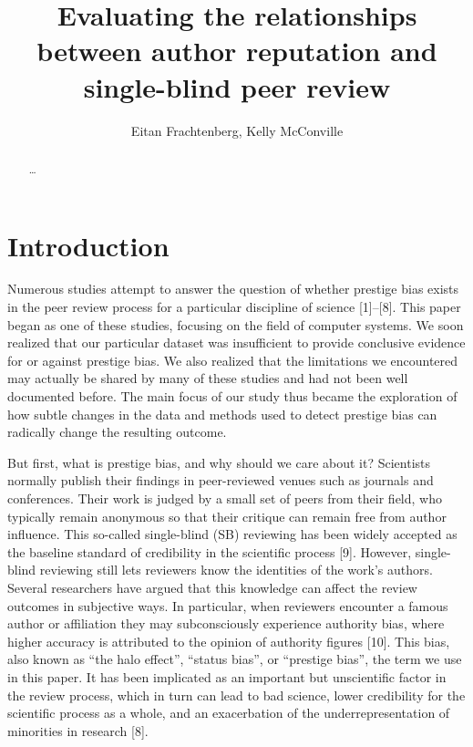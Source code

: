 \documentclass[12pt]{article}
\title{Evaluating the relationships between author reputation and single-blind peer review}
\author{Eitan Frachtenberg, Kelly McConville}
\begin{document}
\maketitle

\begin{abstract}
  \ldots{}
\end{abstract}

\hypertarget{sec:intro}{%
\section{Introduction}\label{sec:intro}}

Numerous studies attempt to answer the question of whether prestige bias exists in the peer review process for a particular discipline of science {[}1{]}--{[}8{]}.
This paper began as one of these studies, focusing on the field of computer systems.
We soon realized that our particular dataset was insufficient to provide conclusive evidence for or against prestige bias.
We also realized that the limitations we encountered may actually be shared by many of these studies and had not been well documented before.
The main focus of our study thus became the exploration of how subtle changes in the data and methods used to detect prestige bias can radically change the resulting outcome.

But first, what is prestige bias, and why should we care about it?
Scientists normally publish their findings in peer-reviewed venues such as journals and conferences.
Their work is judged by a small set of peers from their field, who typically remain anonymous so that their critique can remain free from author influence.
This so-called single-blind (SB) reviewing has been widely accepted as the baseline standard of credibility in the scientific process {[}9{]}.
However, single-blind reviewing still lets reviewers know the identities of the work's authors.
Several researchers have argued that this knowledge can affect the review outcomes in subjective ways.
In particular, when reviewers encounter a famous author or affiliation they may subconsciously experience authority bias, where higher accuracy is attributed to the opinion of authority figures {[}10{]}.
This bias, also known as ``the halo effect'', ``status bias'', or ``prestige bias'', the term we use in this paper.
It has been implicated as an important but unscientific factor in the review process, which in turn can lead to bad science, lower credibility for the scientific process as a whole, and an exacerbation of the underrepresentation of minorities in research {[}8{]}.
\end{document}
